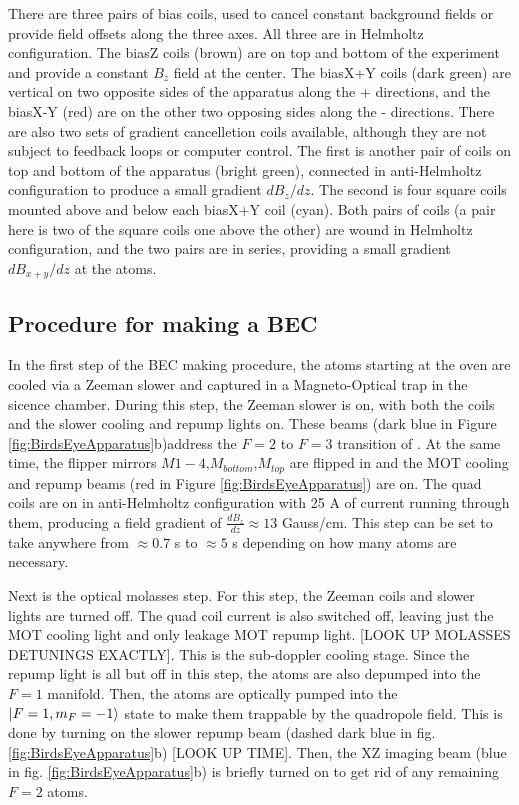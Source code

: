 There are three pairs of bias coils, used to cancel constant background fields or provide field offsets along the three axes. All three are in Helmholtz configuration. The biasZ coils (brown) are on top and bottom of the experiment and provide a constant $B_z$ field at the center. The biasX+Y coils (dark green) are vertical on two opposite sides of the apparatus along the \ex{}+\ey{} directions, and the biasX-Y (red) are on the other two opposing sides along the \ex{}-\ey{} directions. There are also two sets of gradient cancelletion coils available, although they are not subject to feedback loops or computer control. The first is another pair of coils on top and bottom of the apparatus (bright green), connected in anti-Helmholtz configuration to produce a small gradient $dB_z/dz$. The second is four square coils mounted above and below each biasX+Y coil (cyan). Both pairs of coils (a pair here is two of the square coils one above the other) are wound in Helmholtz configuration, and the two pairs are in series, providing a small gradient $dB_{x+y}/dz$ at the atoms.  


\subsection{Procedure for making a BEC}\label{sec:BECsequence}

In the first step of the BEC making procedure, the atoms starting at the oven are cooled via a Zeeman slower and captured in a Magneto-Optical trap in the sicence chamber. During this step, the Zeeman slower is on, with both the coils and the slower cooling and repump lights on. These beams (dark blue in Figure \ref{fig:BirdsEyeApparatus}b)address the $F=2$ to $F=3$ transition of \Rb{}. At the same time, the flipper mirrors $M1-4$,$M_{bottom}$,$M_{top}$ are flipped in and the MOT cooling and repump beams (red in Figure \ref{fig:BirdsEyeApparatus}) are on. The quad coils are on in anti-Helmholtz configuration with 25 A of current running through them, producing a field gradient of $\frac{dB_z}{dz}\approx13$ Gauss/cm. This step can be set to take anywhere from $\approx0.7$ s to $\approx5$ s depending on how many atoms are necessary.  

Next is the optical molasses step. For this step, the Zeeman coils and slower lights are turned off. The quad coil current is also switched off, leaving just the MOT cooling light and only leakage MOT repump light. [LOOK UP MOLASSES DETUNINGS EXACTLY]. This is the sub-doppler cooling stage. Since the repump light is all but off in this step, the atoms are also depumped into the $F=1$ manifold. Then, the atoms are optically pumped into the $\mathinner{|{F=1,m_F=-1}\rangle}$ state to make them trappable by the quadropole field. This is done by turning on the slower repump beam (dashed dark blue in fig. \ref{fig:BirdsEyeApparatus}b) [LOOK UP TIME]. Then, the XZ imaging beam (blue in fig. \ref{fig:BirdsEyeApparatus}b) is briefly turned on to get rid of any remaining $F=2$ atoms. 

